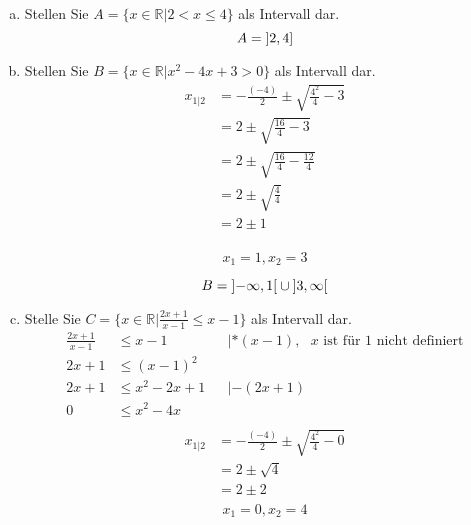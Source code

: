 \documentclass{article}
\begin{document}
\begin{enumerate}[a)]
\item Stellen Sie $A = \{ x \in \mathbb{R} | 2 < x \leq 4 \}$ als Intervall dar.
  \[
    A = \interval[open left]{2}{4}
  \]

\item Stellen Sie $B = \{ x \in \mathbb{R} | x^2 - 4x + 3 > 0 \}$ als Intervall dar.
  \begin{align*}
    x_{1|2} &= -\frac{(-4)}{2} \pm \sqrt{\frac{4^2}{4} - 3} \\
            &= 2 \pm \sqrt{\frac{16}{4} - 3} \\
            &= 2 \pm \sqrt{\frac{16}{4} - \frac{12}{4}} \\
            &= 2 \pm \sqrt{\frac{4}{4}} \\
            &= 2 \pm 1 \\
  \end{align*}

  \[
    x_1 = 1, x_2 = 3
  \]

  
  \[
    B = \interval[open]{-\infty}{1} \cup \interval[open]{3}{\infty}
  \]

\item Stelle Sie $C = \{ x \in \mathbb{R} | \frac{2x + 1}{x - 1} \leq x - 1 \}$ als Intervall dar.
  \begin{align*}
    \frac{2x + 1}{x - 1} &\leq x - 1        &&| * (x - 1), \text{ $x$ ist für $1$ nicht definiert} \\
                  2x + 1 &\leq (x - 1)^2 \\
                  2x + 1 &\leq x^2 - 2x + 1 &&| -(2x + 1)\\
                       0 &\leq x^2 - 4x \\
  \end{align*}
  \begin{align*}
    x_{1|2} &= -\frac{(-4)}{2} \pm \sqrt{\frac{4^2}{4} - 0} \\
            &= 2 \pm \sqrt{4} \\
            &= 2 \pm 2 \\
  \end{align*}
  \[
    x_1 = 0, x_2 = 4
  \]


\end{enumerate}
\end{document}
